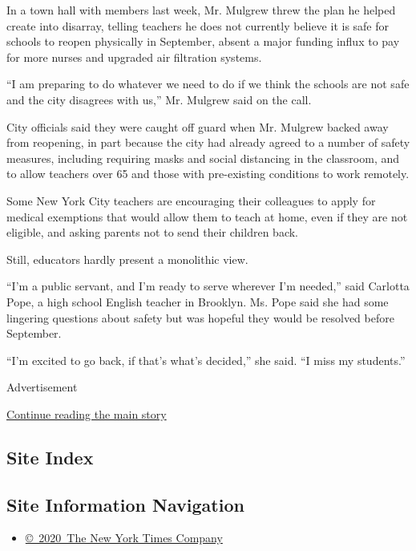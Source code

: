 In a town hall with members last week, Mr. Mulgrew threw the plan he
helped create into disarray, telling teachers he does not currently
believe it is safe for schools to reopen physically in September, absent
a major funding influx to pay for more nurses and upgraded air
filtration systems.

``I am preparing to do whatever we need to do if we think the schools
are not safe and the city disagrees with us,'' Mr. Mulgrew said on the
call.

City officials said they were caught off guard when Mr. Mulgrew backed
away from reopening, in part because the city had already agreed to a
number of safety measures, including requiring masks and social
distancing in the classroom, and to allow teachers over 65 and those
with pre-existing conditions to work remotely.

Some New York City teachers are encouraging their colleagues to apply
for medical exemptions that would allow them to teach at home, even if
they are not eligible, and asking parents not to send their children
back.

Still, educators hardly present a monolithic view.

``I'm a public servant, and I'm ready to serve wherever I'm needed,''
said Carlotta Pope, a high school English teacher in Brooklyn. Ms. Pope
said she had some lingering questions about safety but was hopeful they
would be resolved before September.

``I'm excited to go back, if that's what's decided,'' she said. ``I miss
my students.''

Advertisement

\protect\hyperlink{after-bottom}{Continue reading the main story}

\hypertarget{site-index}{%
\subsection{Site Index}\label{site-index}}

\hypertarget{site-information-navigation}{%
\subsection{Site Information
Navigation}\label{site-information-navigation}}

\begin{itemize}
\tightlist
\item
  \href{https://help.nytimes.com/hc/en-us/articles/115014792127-Copyright-notice}{©~2020~The
  New York Times Company}
\end{itemize}

